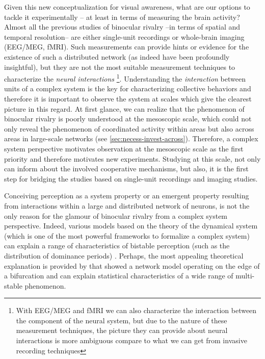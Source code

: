 Given this new conceptualization for visual awareness,
what are our  options to tackle it experimentally -- at least in terms of measuring the brain activity?
Almost all the previous studies of binocular rivalry
--in terms of spatial and temporal resolution-- 
are either single-unit recordings or whole-brain imaging (EEG/MEG, fMRI).
Such measurements can provide hints or evidence for the existence of such a distributed network (as indeed have been profoundly insightful), 
but they are not the most suitable  measurement techniques to characterize the \emph{neural interactions}
\footnote{
  With EEG/MEG and fMRI we can also characterize the interaction between the component of the neural system,
  but due to the nature of these measurement techniques, the picture they can provide about neural interactions is more ambiguous compare to what we can get from invasive recording techniques}.
Understanding the \emph{interaction} between units of a complex system is the key for characterizing collective behaviors and therefore it is important to observe the system at scales which give the clearest picture in this regard.
At first glance, we can realize that the phenomenon of binocular rivalry is poorly understood at the mesoscopic scale, 
which could not only reveal the phenomenon of coordinated activity 
within areas but also across areas in large-scale networks 
(see \autoref{sec:necess-invest-across}).
Therefore, a complex system perspective motivates observation at the mesoscopic scale as the first priority
and therefore motivates new experiments.
Studying at this scale, not only can inform about the involved cooperative mechanisms,
but also, it is the first step for bridging the studies based on single-unit recordings and imaging studies.


Conceiving perception as a system property or an emergent property
resulting from interactions within a large and distributed network of neurons, 
is not the only reason for the glamour of binocular rivalry from a complex system perspective.
Indeed, various models based on the theory of the dynamical system
(which is one of the most powerful frameworks to formalize a complex system)
can explain a range of characteristics of bistable perception (such as the distribution of dominance periods)
\cite{ditzingerOscillationsPerceptionAmbiguous1989b,braunAttractorsNoiseTwin2010,theodoniCorticalMicrocircuitDynamics2011a,pastukhovMultistablePerceptionBalances2013a}.
Perhaps, the most  appealing theoretical explanation is provided by \citet{pastukhovMultistablePerceptionBalances2013a}
that showed a network model operating on the edge of a bifurcation and can explain statistical characteristics of a wide range of multi-stable phenomenon.

